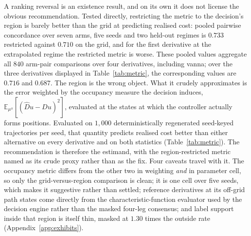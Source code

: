 \documentclass{article}
\begin{document}
A ranking reversal is an existence result, and on its own it does not license the
obvious recommendation. Tested directly, restricting the metric to the decision's
region is barely better than the grid at predicting realised cost: pooled pairwise
concordance over seven arms, five seeds and two held-out regimes is $0.733$
restricted against $0.710$ on the grid, and for the first derivative at the
extrapolated regime the restricted metric is worse. These pooled values aggregate
all $840$ arm-pair comparisons over four derivatives, including vanna; over the
three derivatives displayed in Table~\ref{tab:metric}, the corresponding values are
$0.716$ and $0.687$. The region is the wrong object.
What it crudely approximates is the error weighted by the occupancy measure the
decision induces, $\mathbb{E}_{\mu^{\pi}}[(\hat{D}u - Du)^{2}]$, evaluated at the
states at which the controller actually forms positions. Evaluated on $1{,}000$
deterministically regenerated seed-keyed trajectories per seed, that quantity predicts
realised cost better than either alternative on every derivative and on both
statistics (Table~\ref{tab:metric}). The recommendation is therefore the estimand,
with the region-restricted metric named as its crude proxy rather than as the fix.
Four caveats travel with it. The occupancy metric differs from the other two in
weighting \emph{and} in parameter cell, so only the grid-versus-region comparison is
clean; it is one cell over five seeds, which makes it suggestive rather than settled;
reference derivatives at its off-grid path states come directly from the
characteristic-function evaluator used by the decision engine rather than the
masked four-leg consensus; and label support inside that region is itself thin,
masked at $1.30$ times the outside rate
(Appendix~\ref{app:exhibits}).
\end{document}
